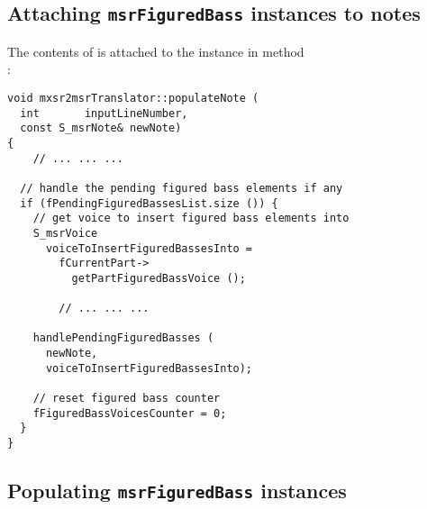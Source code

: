 \subsection{Attaching {\tt msrFiguredBass} instances to notes}

The contents of  is attached to the  instance in method\\
:
\begin{lstlisting}[language=CPlusPlus]
void mxsr2msrTranslator::populateNote (
  int       inputLineNumber,
  const S_msrNote& newNote)
{
	// ... ... ...

  // handle the pending figured bass elements if any
  if (fPendingFiguredBassesList.size ()) {
    // get voice to insert figured bass elements into
    S_msrVoice
      voiceToInsertFiguredBassesInto =
        fCurrentPart->
          getPartFiguredBassVoice ();

		// ... ... ...

    handlePendingFiguredBasses (
      newNote,
      voiceToInsertFiguredBassesInto);

    // reset figured bass counter
    fFiguredBassVoicesCounter = 0;
  }
}
\end{lstlisting}


\subsection{Populating {\tt msrFiguredBass} instances}

